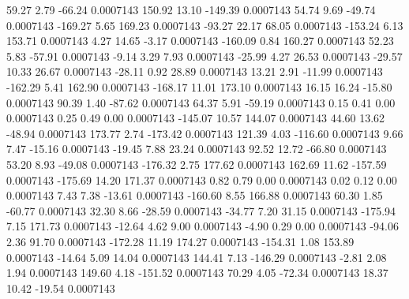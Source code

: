        59.27        2.79      -66.24     0.0007143
      150.92       13.10     -149.39     0.0007143
       54.74        9.69      -49.74     0.0007143
     -169.27        5.65      169.23     0.0007143
      -93.27       22.17       68.05     0.0007143
     -153.24        6.13      153.71     0.0007143
        4.27       14.65       -3.17     0.0007143
     -160.09        0.84      160.27     0.0007143
       52.23        5.83      -57.91     0.0007143
       -9.14        3.29        7.93     0.0007143
      -25.99        4.27       26.53     0.0007143
      -29.57       10.33       26.67     0.0007143
      -28.11        0.92       28.89     0.0007143
       13.21        2.91      -11.99     0.0007143
     -162.29        5.41      162.90     0.0007143
     -168.17       11.01      173.10     0.0007143
       16.15       16.24      -15.80     0.0007143
       90.39        1.40      -87.62     0.0007143
       64.37        5.91      -59.19     0.0007143
        0.15        0.41        0.00     0.0007143
        0.25        0.49        0.00     0.0007143
     -145.07       10.57      144.07     0.0007143
       44.60       13.62      -48.94     0.0007143
      173.77        2.74     -173.42     0.0007143
      121.39        4.03     -116.60     0.0007143
        9.66        7.47      -15.16     0.0007143
      -19.45        7.88       23.24     0.0007143
       92.52       12.72      -66.80     0.0007143
       53.20        8.93      -49.08     0.0007143
     -176.32        2.75      177.62     0.0007143
      162.69       11.62     -157.59     0.0007143
     -175.69       14.20      171.37     0.0007143
        0.82        0.79        0.00     0.0007143
        0.02        0.12        0.00     0.0007143
        7.43        7.38      -13.61     0.0007143
     -160.60        8.55      166.88     0.0007143
       60.30        1.85      -60.77     0.0007143
       32.30        8.66      -28.59     0.0007143
      -34.77        7.20       31.15     0.0007143
     -175.94        7.15      171.73     0.0007143
      -12.64        4.62        9.00     0.0007143
       -4.90        0.29        0.00     0.0007143
      -94.06        2.36       91.70     0.0007143
     -172.28       11.19      174.27     0.0007143
     -154.31        1.08      153.89     0.0007143
      -14.64        5.09       14.04     0.0007143
      144.41        7.13     -146.29     0.0007143
       -2.81        2.08        1.94     0.0007143
      149.60        4.18     -151.52     0.0007143
       70.29        4.05      -72.34     0.0007143
       18.37       10.42      -19.54     0.0007143
